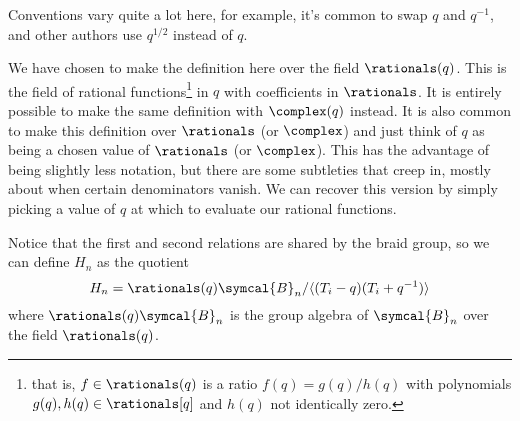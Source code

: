 \documentclass[fleqn]{NotesClass}
\newcommand{\braid}{\symcal{B}}
\begin{document}
    \begin{wrn}
        Conventions vary quite a lot here, for example, it's common to swap \(q\) and \(q^{-1}\), and other authors use \(q^{1/2}\) instead of \(q\).
    \end{wrn}
    
    \begin{remark}{}{}
        We have chosen to make the definition here over the field \(\rationals(q)\).
        This is the field of rational functions\footnote{that is, \(f \in \rationals(q)\) is a ratio \(f(q) = g(q)/h(q)\) with polynomials \(g(q), h(q) \in \rationals[q]\) and \(h(q)\) not identically zero.} in \(q\) with coefficients in \(\rationals\).
        It is entirely possible to make the same definition with \(\complex(q)\) instead.
        It is also common to make this definition over \(\rationals\) (or \(\complex\)) and just think of \(q\) as being a chosen value of \(\rationals\) (or \(\complex\)).
        This has the advantage of being slightly less notation, but there are some subtleties that creep in, mostly about when certain denominators vanish.
        We can recover this version by simply picking a value of \(q\) at which to evaluate our rational functions.
    \end{remark}
    
    Notice that the first and second relations are shared by the braid group, so we can define \(H_n\) as the quotient
    \begin{equation}
        H_n = \rationals(q)\braid_n / \langle (T_i - q)(T_i + q^{-1}) \rangle
    \end{equation}
    where \(\rationals(q)\braid_n\) is the group algebra of \(\braid_n\) over the field \(\rationals(q)\).
    
\end{document}
